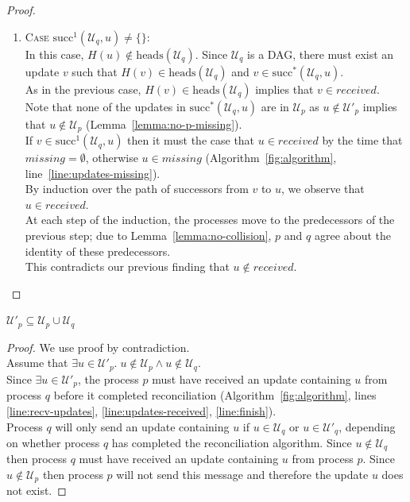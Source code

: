 \documentclass[a4paper,anonymous,USenglish]{lipics-v2019}
\begin{document}
\begin{proof}
\begin{enumerate}
    \item\textsc{Case} $\mathrm{succ}^1(\mathcal{U}_q, u) \ne \{\}$:\\
    In this case, $H(u) \notin \mathrm{heads}(\mathcal{U}_q)$.
    Since $\mathcal{U}_q$ is a DAG, there must exist an update $v$ such that $H(v) \in \mathrm{heads}(\mathcal{U}_q)$ and $v \in \mathrm{succ}^*(\mathcal{U}_q, u)$.\\
    As in the previous case, $H(v) \in \mathrm{heads}(\mathcal{U}_q)$ implies that $v \in \mathit{received}$.\\
    Note that none of the updates in $\mathrm{succ}^*(\mathcal{U}_q, u)$ are in $\mathcal{U}_p$ as $u \notin \mathcal{U}'_p$ implies that  $u \notin \mathcal{U}_p$ (Lemma~\ref{lemma:no-p-missing}).\\
    If $v \in \mathrm{succ}^1(\mathcal{U}_q, u)$ then it must the case that $u \in \mathit{received}$ by the time that $\mathit{missing} = \emptyset$, otherwise $u \in \mathit{missing}$ (Algorithm~\ref{fig:algorithm}, line~\ref{line:updates-missing}).\\
    By induction over the path of successors from $v$ to $u$, we observe that $u \in \mathit{received}$.\\
    At each step of the induction, the processes move to the predecessors of the previous step; due to Lemma~\ref{lemma:no-collision}, $p$ and $q$ agree about the identity of these predecessors.\\
    This contradicts our previous finding that $u \notin \mathit{received}$.
\end{enumerate}
\end{proof}

\begin{lemma}\label{lemma:no-extras}
$\mathcal{U}'_p \subseteq \mathcal{U}_p \cup \mathcal{U}_q$    
\end{lemma}
\begin{proof}
We use proof by contradiction.\\
Assume that $\exists u \in \mathcal{U}'_p.\; u \notin \mathcal{U}_p  \land  u \notin \mathcal{U}_q$.\\
Since $\exists u \in \mathcal{U}'_p$, the process $p$ must have received an update containing $u$ from process $q$ before it completed reconciliation (Algorithm~\ref{fig:algorithm}, lines \ref{line:recv-updates}, \ref{line:updates-received}, \ref{line:finish}).\\
Process $q$ will only send an update containing $u$ if $u \in \mathcal{U}_q$ or $u \in \mathcal{U}'_q$, depending on whether process $q$ has completed the reconciliation algorithm.
Since $u \notin \mathcal{U}_q$ then process $q$ must have received an update containing $u$ from process $p$.
Since $u \notin \mathcal{U}_p$ then process $p$ will not send this message and therefore the update $u$ does not exist.
\end{proof}
\end{document}
